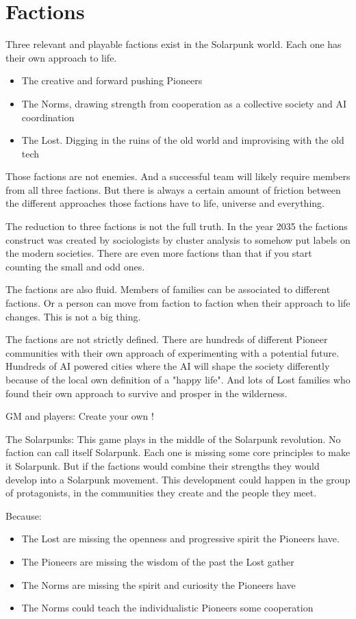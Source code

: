 \chapter{Factions}

Three relevant and playable factions exist in the Solarpunk world. Each one has their own approach to life.

\begin{itemize}
    \item The creative and forward pushing Pioneers
    \item The Norms, drawing strength from cooperation as a collective society and AI coordination
    \item The Lost. Digging in the ruins of the old world and improvising with the old tech
\end{itemize}

Those factions are not enemies. And a successful team will likely require members from all three factions. But there is always a certain amount of friction between the different approaches those factions have to life, universe and everything.

The reduction to three factions is not the full truth. In the year 2035 the factions construct was created by sociologists by cluster analysis to somehow put labels on the modern societies. There are even more factions than that if you start counting the small and odd ones.

The factions are also fluid. Members of families can be associated to different factions. Or a person can move from faction to faction when their approach to life changes. This is not a big thing.

The factions are not strictly defined. There are hundreds of different Pioneer communities with their own approach of experimenting with a potential future. Hundreds of AI powered cities where the AI will shape the society differently because of the local own definition of a "happy life". And lots of Lost families who found their own approach to survive and prosper in the wilderness.

GM and players: Create your own !

The Solarpunks: This game plays in the middle of the Solarpunk revolution. No faction can call itself Solarpunk. Each one is missing some core principles to make it Solarpunk. But if the factions would combine their strengths they would develop into a Solarpunk movement. This development could happen in the group of protagonists, in the communities they create and the people they meet.

Because:

\begin{itemize}
\item The Lost are missing the openness and progressive spirit the Pioneers have.
\item The Pioneers are missing the wisdom of the past the Lost gather
\item The Norms are missing the spirit and curiosity the Pioneers have
\item The Norms could teach the individualistic Pioneers some cooperation
\end{itemize}
